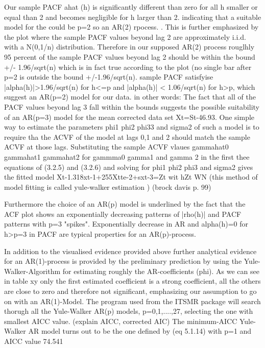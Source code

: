 \documentclass[11pt,a4paper]{article}
\begin{document}
Our sample PACF ahat (h) is significantly different than zero for all h smaller or equal than 2 and becomes negligible for h larger than 2. indicating that a suitable model for the could be p=2 so an AR(2) rpocess. . This is further emphasized by the plot where the sample PACF values beyond lag 2 are approximately i.i.d. with a N(0,1/n) distribution. Therefore in our supposed AR(2) process rouglhly 95 percent of the sample PACF values beyond lag 2 should be within the bound +/- 1.96/sqrt(n) which is in fact true according to the plot (no single bar after p=2 is outside the bound +/-1.96/sqrt(n). sample PACF satisfyise |alpha(h)|>1.96/sqrt(n) for h<=p and |alpha(h)| < 1.06/sqrt(n) for h>p, which suggest an AR(p=2) model for our data.
in other words: The fact that all of the PACF values beyond lag 3 fall within the bounds suggests the possible suitability of an AR(p=3) model for the mean corrected data set Xt=St-46.93. One simple way to estimate the parameters phi1 phi2 phi33 and sigma2 of such a model is to require tha the ACVF of the model at lags 0,1 and 2 should match the sample ACVF at those lags. Substituting the sample ACVF vlaues gammahat0 gammahat1 gammahat2 for gammma0 gamma1 and gamma 2 in the first thee equations of (3.2.5) and (3.2.6) and solving for phi1 phi2 phi3 and sigma2 gives the fitted model Xt-1.318xt-1+255Xtte-2+sxt-3=Zt wit hZt  WN (this method of model fitting is called yule-walker estimation ) (brock davis p. 99)

Furthermore the choice of an AR(p) model is underlined by the fact that the ACF plot shows an exponentially decreasing patterns of |rho(h)| and PACF patterns with p=3 "spikes". Exponentially decrease in AR and alpha(h)=0 for h>p=3 in PACF are typical properties for an AR(p)-process.

In addition to the visualised evidence provided above further analytical evidence for an AR(1)-process is provided by the preliminary prediction by using the Yule-Walker-Algorithm for estimating roughly the AR-coefficients (phi). As we can see in table xy only the first estimated coefficient is a strong coefficient, all the others are close to zero and therefore not significant, emphasizing our assumption to go on with an AR(1)-Model.
The program used from the ITSMR package will search thorugh all the Yule-Walker AR(p) models, p=0,1,....,27, selecting the one with smallest AICC value. (explain AICC, corrected AIC) The minimum-AICC Yule-Walker AR model turns out to be the one defined by (eq 5.1.14) with p=1 and AICC value 74.541
\end{document}
